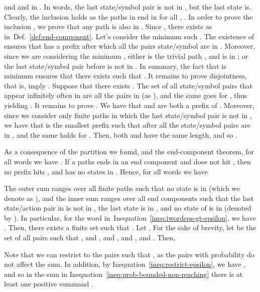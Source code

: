 \documentclass[final,3p,times,twocolumn]{elsarticle}
\theoremstyle{plain}
\theoremstyle{definition}
\newcommand{\recallInequation}[1]{Inequation~\ref{#1}}
\newcommand{\recallDefinition}[1]{Def.~\ref{#1}}
\begin{document}
and  and 
in . In words, the last state/symbol pair is not in , but the last state
is. Clearly, the inclusion  holds as the
paths in  end in  for all , . In order to prove the
inclusion , we prove that any path
 is also in . Since
, there exists  as
in~\recallDefinition{def:end-component}. Let's consider the minimum such .
The existence of  ensures that  has a prefix  after which
all the pairs state/symbol are in . Moreover, since we are considering the
minimum , either  is the trivial path , and 
is in ; or the last state/symbol pair before  is not in .
In summary, the fact that  is minimum ensures that there exists
 such that . It remains to
prove disjointness, that is, 
imply . Suppose that there exists
. The set of all state/symbol pairs
that appear infinitely often in  are all the pairs in 
(as ), and the same goes for , thus yielding
. It remains to prove . We have that  and
 are both a prefix of . Moreover, since we consider only
finite paths in which the last state/symbol pair is not in , we have that
 is the smallest prefix such that after  all the state/symbol
pairs are in , and the same holds for . Then, both  and
 have the same length, and so .

As a consequence of the partition we found, and the end-component theorem, for
all words  we have
.
If a paths ends in an end component  and does not hit , then no
prefix hits , and  has no states in . Hence, for all
words  we have

The outer sum ranges over all finite paths such that no state is in 
(which we denote as ), and the inner sum
ranges over all end components  such that the last state/action pair in
 is not in , the last state is in , and no state of  is in
 (denoted by ). In particular, for the
word  in~\recallInequation{ineq:iwordeps-gt-epsilon}, we have
.
Then, there exists a finite set
 such that
.
Let . For the sake of brevity,
let  be the set of all pairs  such that
, and , and
, and , and
. Then,


Note that we can restrict to the pairs  such that
, as the pairs with probability 
do not affect the sum.
In addition, by \recallInequation{ineq:restrict-epsilon}, we have
, and so in the sum in
\recallInequation{ineq:prob-bounded-non-reaching} there is at least one
positive summand .
\end{document}
